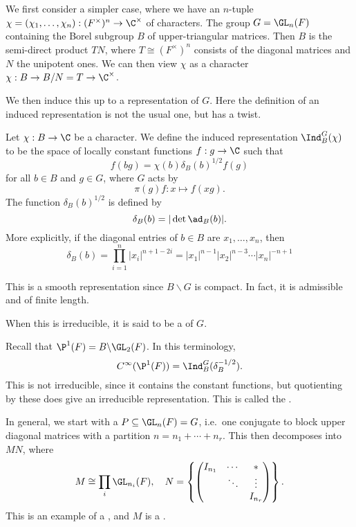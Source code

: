 \documentclass[a4paper]{article}
\begin{document}
We first consider a simpler case, where we have an $n$-tuple $\chi = (\chi_1, \ldots, \chi_n): (F^\times)^n \to \C^\times$ of characters. The group $G = \GL_n(F)$ containing the Borel subgroup $B$ of upper-triangular matrices. Then $B$ is the semi-direct product $TN$, where $T \cong (F^\times)^n$ consists of the diagonal matrices and $N$ the unipotent ones. We can then view $\chi$ as a character $\chi: B \to B/N = T \to \C^\times$.

We then induce this up to a representation of $G$. Here the definition of an induced representation is not the usual one, but has a twist.
\begin{defi}
  Let $\chi: B \to \C$ be a character. We define the induced representation $\Ind^G_B(\chi)$ to be the space of locally constant functions $f: g \to \C$ such that
  \[
    f(bg) = \chi(b) \delta_B(b)^{1/2} f(g)
  \]
  for all $b \in B$ and $g \in G$, where $G$ acts by
  \[
    \pi(g) f: x \mapsto f(xg).
  \]
  The function $\delta_B(b)^{1/2}$ is defined by
  \[
    \delta_B(b) = |\det \ad_B(b)|.
  \]
  More explicitly, if the diagonal entries of $b \in B$ are $x_1, \ldots, x_n$, then
  \[
    \delta_B(b) = \prod_{i = 1}^n |x_i|^{n + 1 - 2i} = |x_1|^{n - 1} |x_2|^{n - 3} \cdots |x_n|^{-n + 1}
  \]

  This is a smooth representation since $B\backslash G$ is compact. In fact, it is admissible and of finite length.

  When this is irreducible, it is said to be a  of $G$.
\end{defi}
\begin{eg}
  Recall that $\P^1(F) = B \backslash \GL_2(F)$. In this terminology,
  \[
    C^\infty(\P^1(F)) = \Ind_B^G(\delta_B^{-1/2}).
  \]
  This is not irreducible, since it contains the constant functions, but quotienting by these does give an irreducible representation. This is called the .
\end{eg}

In general, we start with a  $P \subseteq \GL_n(F) = G$, i.e.\ one conjugate to block upper diagonal matrices with a partition $n = n_1 + \cdots + n_r$. This then decomposes into $MN$, where
\[
  M \cong \prod_i \GL_{n_i}(F),\quad N = \left\{
    \begin{pmatrix}
      I_{n_1} & \cdots & *\\
      & \ddots & \vdots\\
      & & I_{n_r}
    \end{pmatrix}
  \right\}.
\]
This is an example of a , and $M$ is a .
\end{document}
